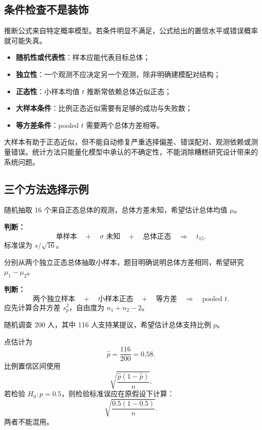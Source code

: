 \documentclass[11pt,a4paper]{article}
\begin{document}
\subsection{条件检查不是装饰}

推断公式来自特定概率模型。若条件明显不满足，公式给出的置信水平或错误概率就可能失真。

\begin{itemize}
  \item \textbf{随机性或代表性}：样本应能代表目标总体；
  \item \textbf{独立性}：一个观测不应决定另一个观测，除非明确建模配对结构；
  \item \textbf{正态性}：小样本均值 $t$ 推断常依赖总体近似正态；
  \item \textbf{大样本条件}：比例正态近似需要有足够的成功与失败数；
  \item \textbf{等方差条件}：pooled $t$ 需要两个总体方差相等。
\end{itemize}

\begin{warnbox}
大样本有助于正态近似，但不能自动修复严重选择偏差、错误配对、观测依赖或测量错误。统计方法只能量化模型中承认的不确定性，不能消除糟糕研究设计带来的系统问题。
\end{warnbox}

\subsection{三个方法选择示例}

\begin{examplebox}[示例 1：单总体均值]
随机抽取 16 个来自正态总体的观测，总体方差未知，希望估计总体均值 $\mu$。

\textbf{判断：}
\[
  \text{单样本}
  \quad+\quad
  \sigma\text{ 未知}
  \quad+\quad
  \text{总体正态}
  \quad\Longrightarrow\quad
  t_{15}.
\]
标准误为 $s/\sqrt{16}$。
\end{examplebox}

\begin{examplebox}[示例 2：两个均值]
分别从两个独立正态总体抽取小样本，题目明确说明总体方差相同，希望研究 $\mu_1-\mu_2$。

\textbf{判断：}
\[
  \text{两个独立样本}
  \quad+\quad
  \text{小样本正态}
  \quad+\quad
  \text{等方差}
  \quad\Longrightarrow\quad
  \text{pooled }t.
\]
应先计算合并方差 $s_p^2$，自由度为 $n_1+n_2-2$。
\end{examplebox}

\begin{examplebox}[示例 3：总体比例]
随机调查 200 人，其中 116 人支持某提议，希望估计总体支持比例 $p$。

点估计为
\[
  \hat p=\frac{116}{200}=0.58.
\]
比例置信区间使用
\[
  \sqrt{\frac{\hat p(1-\hat p)}{n}}.
\]
若检验 $H_0:p=0.5$，则检验标准误应在原假设下计算：
\[
  \sqrt{\frac{0.5(1-0.5)}{n}}.
\]
两者不能混用。
\end{examplebox}
\end{document}
